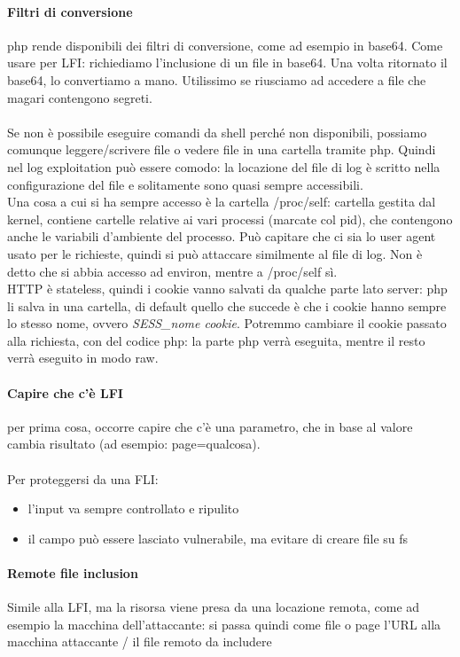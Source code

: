 \documentclass{article}
\begin{document}
\paragraph{Filtri di conversione}php rende disponibili dei filtri di conversione, come ad esempio in base64. Come usare per LFI: richiediamo l'inclusione di un file in base64. Una volta ritornato il base64, lo convertiamo a mano. Utilissimo se riusciamo ad accedere a file che magari contengono segreti.\\\\ Se non è possibile eseguire comandi da shell perché non disponibili, possiamo comunque leggere/scrivere file o vedere file in una cartella tramite php. Quindi nel log exploitation può essere comodo: la locazione del file di log è scritto nella configurazione del file e solitamente sono quasi sempre accessibili. \\ Una cosa a cui si ha sempre accesso è la cartella \textsf{/proc/self}: cartella gestita dal kernel, contiene cartelle relative ai vari processi (marcate col pid), che contengono anche le variabili d'ambiente del processo. Può capitare che ci sia lo user agent usato per le richieste, quindi si può attaccare similmente al file di log. Non è detto che si abbia accesso ad environ, mentre a /proc/self sì.\\ HTTP è stateless, quindi i cookie vanno salvati da qualche parte lato server: php li salva in una cartella, di default quello che succede è che i cookie hanno sempre lo stesso nome, ovvero \textit{SESS\_nome cookie}. Potremmo cambiare il cookie passato alla richiesta, con del codice php: la parte php verrà eseguita, mentre il resto verrà eseguito in modo raw.
\paragraph{Capire che c'è LFI}per prima cosa, occorre capire che c'è una parametro, che in base al valore cambia risultato (ad esempio: page=qualcosa).\\\\ Per proteggersi da una FLI:
\begin{itemize}
\item l'input va sempre controllato e ripulito
\item il campo può essere lasciato vulnerabile, ma evitare di creare file su fs
\end{itemize}
\paragraph{Remote file inclusion}
Simile alla LFI, ma la risorsa viene presa da una locazione remota, come ad esempio la macchina dell'attaccante: si passa quindi come file o page l'URL alla macchina attaccante / il file remoto da includere
\end{document}
